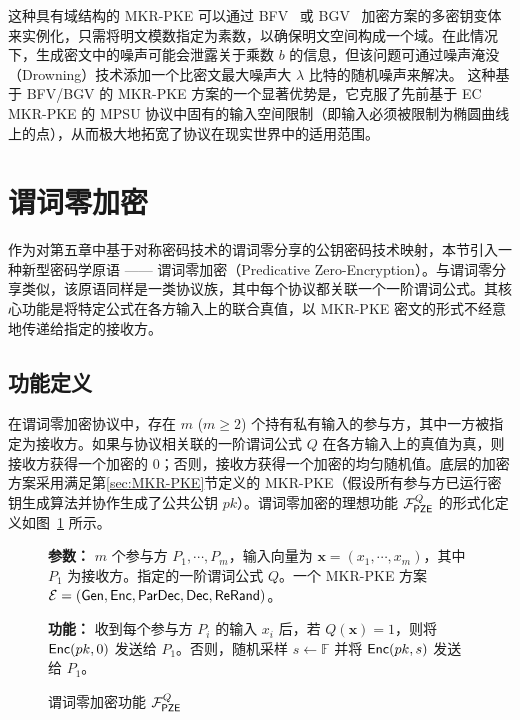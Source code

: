 这种具有域结构的 MKR-PKE 可以通过 BFV~\cite{Brakerski12,FanV12} 或 BGV~\cite{BGV12} 加密方案的多密钥变体来实例化，只需将明文模数指定为素数，以确保明文空间构成一个域。在此情况下，生成密文中的噪声可能会泄露关于乘数 $b$ 的信息，但该问题可通过噪声淹没（Drowning）技术添加一个比密文最大噪声大 $\lambda$ 比特的随机噪声来解决。
这种基于 BFV/BGV 的 MKR-PKE 方案的一个显著优势是，它克服了先前基于 EC MKR-PKE 的 MPSU 协议中固有的输入空间限制（即输入必须被限制为椭圆曲线上的点），从而极大地拓宽了协议在现实世界中的适用范围。

\section{谓词零加密}

作为对第五章中基于对称密码技术的谓词零分享的公钥密码技术映射，本节引入一种新型密码学原语 —— 谓词零加密（Predicative Zero-Encryption）。与谓词零分享类似，该原语同样是一类协议族，其中每个协议都关联一个一阶谓词公式。其核心功能是将特定公式在各方输入上的联合真值，以 MKR-PKE 密文的形式不经意地传递给指定的接收方。

\subsection{功能定义}

在谓词零加密协议中，存在 $m$ ($m \ge 2$) 个持有私有输入的参与方，其中一方被指定为接收方。如果与协议相关联的一阶谓词公式 $Q$ 在各方输入上的真值为真，则接收方获得一个加密的 0；否则，接收方获得一个加密的均匀随机值。底层的加密方案采用满足第\ref{sec:MKR-PKE}节定义的 MKR-PKE（假设所有参与方已运行密钥生成算法并协作生成了公共公钥 $pk$）。谓词零加密的理想功能 $\mathcal{F}_\mathsf{PZE}^Q$ 的形式化定义如图~\ref{fig:func-pze} 所示。

\begin{figure}[!htb]
\begin{framed}
\begin{minipage}[c]{\textwidth}
\begin{trivlist}
\item \textbf{参数：} $m$ 个参与方 $P_1, \cdots, P_m$，输入向量为 $\textbf{x} = (x_1, \cdots, x_m)$，其中 $P_1$ 为接收方。指定的一阶谓词公式 $Q$。一个 MKR-PKE 方案 $\mathcal{E} = (\mathsf{Gen}, \mathsf{Enc}, \mathsf{ParDec}, \mathsf{Dec}, \mathsf{ReRand})$。
\item \textbf{功能：} 收到每个参与方 $P_i$ 的输入 $x_i$ 后，若 $Q(\textbf{x}) = 1$，则将 $\mathsf{Enc}(pk,0)$ 发送给 $P_1$。否则，随机采样 $s \gets \mathbb{F}$ 并将 $\mathsf{Enc}(pk,s)$ 发送给 $P_1$。
\end{trivlist}
\end{minipage}
\end{framed}
\caption{谓词零加密功能 $\mathcal{F}_\mathsf{PZE}^Q$}\label{fig:func-pze}
\end{figure}

